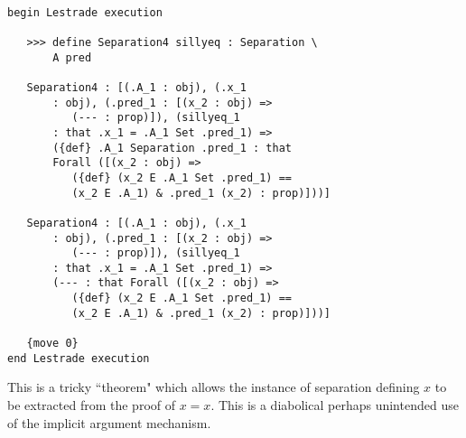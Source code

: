 \documentclass[12pt]{article}
\begin{document}
\begin{verbatim}

begin Lestrade execution

   >>> define Separation4 sillyeq : Separation \
       A pred

   Separation4 : [(.A_1 : obj), (.x_1 
       : obj), (.pred_1 : [(x_2 : obj) => 
          (--- : prop)]), (sillyeq_1 
       : that .x_1 = .A_1 Set .pred_1) => 
       ({def} .A_1 Separation .pred_1 : that 
       Forall ([(x_2 : obj) => 
          ({def} (x_2 E .A_1 Set .pred_1) == 
          (x_2 E .A_1) & .pred_1 (x_2) : prop)]))]

   Separation4 : [(.A_1 : obj), (.x_1 
       : obj), (.pred_1 : [(x_2 : obj) => 
          (--- : prop)]), (sillyeq_1 
       : that .x_1 = .A_1 Set .pred_1) => 
       (--- : that Forall ([(x_2 : obj) => 
          ({def} (x_2 E .A_1 Set .pred_1) == 
          (x_2 E .A_1) & .pred_1 (x_2) : prop)]))]

   {move 0}
end Lestrade execution
\end{verbatim}

This is a tricky ``theorem" which allows the instance of separation defining $x$ to be extracted from the proof of $x=x$.  This is a diabolical perhaps unintended use of the implicit argument mechanism.
\end{document}
